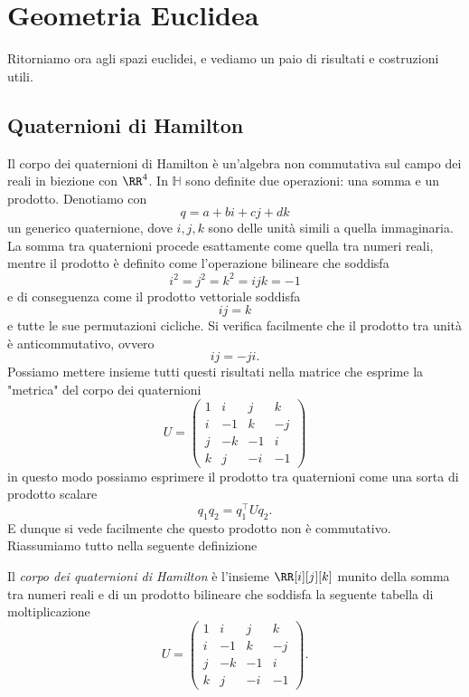 \documentclass[11pt]{scrartcl}
\begin{document}
   	 \section{Geometria Euclidea}
   	 Ritorniamo ora agli spazi euclidei, e vediamo un paio di risultati e costruzioni utili.
   	 \subsection{Quaternioni di Hamilton}
   	 Il corpo dei quaternioni di Hamilton è un'algebra non commutativa sul campo dei reali in biezione con $\RR^4$. In $\mathbb{H}$ sono definite due operazioni: una somma e un prodotto. Denotiamo con
   	 $$q=a+bi+cj+dk$$
   	 un generico quaternione, dove $i,j,k$ sono delle unità simili a quella immaginaria. La somma tra quaternioni procede esattamente come quella tra numeri reali, mentre il prodotto è definito come l'operazione bilineare che soddisfa
   	 $$i^2=j^2=k^2=ijk=-1$$
   	 e di conseguenza come il prodotto vettoriale soddisfa
   	 $$ij=k$$
   	 e tutte le sue permutazioni cicliche. Si verifica facilmente che il prodotto tra unità è anticommutativo, ovvero
   	 $$ij=-ji.$$
   	 Possiamo mettere insieme tutti questi risultati nella matrice che esprime la "metrica" del corpo dei quaternioni
   	 $$U=
   	 \begin{pmatrix}
   	 	1 & i & j & k \\
   	 	i & -1 & k & -j \\
   	 	j & -k & -1 & i \\
   	 	k & j & -i & -1
   	 \end{pmatrix}
   	 $$
   	 in questo modo possiamo esprimere il prodotto tra quaternioni come una sorta di prodotto scalare
   	 $$q_1q_2=q_1^\intercal Uq_2.$$
   	 E dunque si vede facilmente che questo prodotto non è commutativo. Riassumiamo tutto nella seguente definizione
   	 \begin{definition}
   	 	Il \textit{corpo dei quaternioni di Hamilton} è l'insieme $\RR[i][j][k]$ munito della somma tra numeri reali e di un prodotto bilineare che soddisfa la seguente tabella di moltiplicazione
   	 	$$U=
   	 	\begin{pmatrix}
   	 		1 & i & j & k \\
   	 		i & -1 & k & -j \\
   	 		j & -k & -1 & i \\
   	 		k & j & -i & -1
   	 	\end{pmatrix}.
   	 	$$
   	 \end{definition} 
\end{document}
